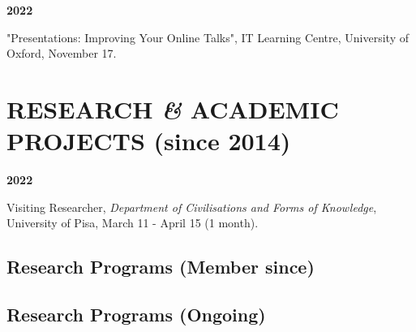 \documentclass{article}
\newcommand{\fr}[1]{} %
\newcommand{\en}[1]{#1}   %
\begin{document}
\textbf{2022 }
\fr{"Presentations: Improving your online talks", IT Learning Centre, University of Oxford, 17 Novembre.}
\en{"Presentations: Improving Your Online Talks", IT Learning Centre, University of Oxford, November 17.}
\smallbreak


\section{\fr{PROJETS DE RECHERCHE \textit{\&} ACADÉMIQUES (depuis 2014)}\en{RESEARCH \textit{\&} ACADEMIC PROJECTS (since 2014)}}

\textbf{2022}
\fr{Chercheur invité, \textit{Dipartimento di Civiltà e forme del Sapere}, Università di Pisa, 11 mars - 15 avril (1 mois).}
\en{Visiting Researcher, \textit{Department of Civilisations and Forms of Knowledge}, University of Pisa, March 11 - April 15 (1 month).}

\smallbreak

\subsection*{\fr{Programmes de recherche (Membre depuis)}\en{Research Programs (Member since)}}
\subsection*{\fr{En cours}\en{Research Programs (Ongoing)}}
\end{document}
